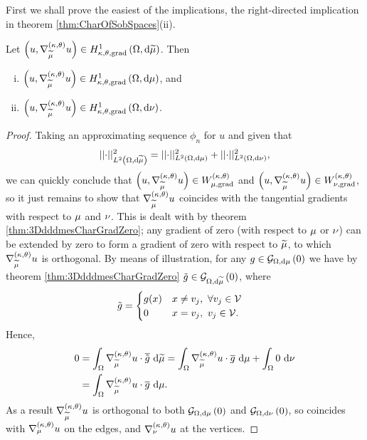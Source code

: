 First we shall prove the easiest of the implications, the right-directed implication in theorem \ref{thm:CharOfSobSpaces}(ii).
\begin{theorem} \label{thm:dddmesTangGradImplication}
	Let $\left( u,\nabla^{\left( \kappa, \theta \right)}_{\widetilde{\mu}}u \right)\in H^1_{\kappa,\theta,\mathrm{grad}}\left( \Omega, \mathrm{d}\widetilde{\mu} \right)$.
	Then
	\begin{enumerate}[(i)]
		\item $\left( u,\nabla^{\left( \kappa, \theta \right)}_{\widetilde{\mu}}u \right)\in H^1_{\kappa,\theta,\mathrm{grad}}\left( \Omega, \mathrm{d}\mu \right)$, and
		\item $\left( u,\nabla^{\left( \kappa, \theta \right)}_{\widetilde{\mu}}u \right)\in H^1_{\kappa,\theta,\mathrm{grad}}\left( \Omega, \mathrm{d}\nu \right)$.
	\end{enumerate}
\end{theorem}
\begin{proof}
	Taking an approximating sequence $\phi_n$ for $u$ and given that
	\begin{align*}
		\lvert\lvert \cdot \rvert\rvert_{L^{2}\left( \Omega,\mathrm{d} \widetilde{\mu} \right)}^2 = \lvert\lvert \cdot \rvert\rvert_{L^{2}\left( \Omega,\mathrm{d} \mu \right)}^2 + \lvert\lvert \cdot \rvert\rvert_{L^{2}\left( \Omega,\mathrm{d} \nu \right)}^2,
	\end{align*}
	we can quickly conclude that $\left( u,\nabla^{\left( \kappa, \theta \right)}_{\widetilde{\mu}}u \right)\in W_{\mu, \mathrm{grad}}^{\left( \kappa, \theta \right)}$ and $\left( u,\nabla^{\left( \kappa, \theta \right)}_{\widetilde{\mu}}u \right)\in W_{\nu, \mathrm{grad}}^{\left( \kappa, \theta \right)}$, so it just remains to show that $\nabla^{\left( \kappa, \theta \right)}_{\widetilde{\mu}}u$ coincides with the tangential gradients with respect to $\mu$ and $\nu$.
	This is dealt with by theorem \ref{thm:3DdddmesCharGradZero}; any gradient of zero (with respect to $\mu$ or $\nu$) can be extended by zero to form a gradient of zero with respect to $\widetilde{\mu}$, to which $\nabla^{\left( \kappa, \theta \right)}_{\widetilde{\mu}}u$ is orthogonal.
	By means of illustration, for any $g\in\mathcal{G}_{ \Omega, \mathrm{d}\mu}\left( 0 \right)$ we have by theorem \ref{thm:3DdddmesCharGradZero} $\tilde{g}\in\mathcal{G}_{ \Omega, \mathrm{d}\widetilde{\mu}}\left( 0 \right)$, where
	\begin{align*}
		\tilde{g} &= 
		\begin{cases} g(x) & x\neq v_j, \ \forall v_j\in\mathcal{V} \\ 0 & x=v_j, \ v_j\in\mathcal{V}. \end{cases}
	\end{align*}
	Hence,
	\begin{align*}
		0 &= \int_{\Omega} \nabla^{\left( \kappa, \theta \right)}_{\widetilde{\mu}}u\cdot\overline{\tilde{g}}  \ \mathrm{d}\widetilde{\mu}
		= \int_{\Omega} \nabla^{\left( \kappa, \theta \right)}_{\widetilde{\mu}}u\cdot\overline{g}  \ \mathrm{d}\mu + \int_{\Omega} 0  \ \mathrm{d}\nu \\
		&= \int_{\Omega} \nabla^{\left( \kappa, \theta \right)}_{\widetilde{\mu}}u\cdot\overline{g}  \ \mathrm{d}\mu.
	\end{align*}
	As a result $\nabla^{\left( \kappa, \theta \right)}_{\widetilde{\mu}}u$ is orthogonal to both $\mathcal{G}_{ \Omega, \mathrm{d}\mu}\left( 0 \right)$ and $\mathcal{G}_{ \Omega, \mathrm{d}\nu}\left( 0 \right)$, so coincides with $\nabla^{\left( \kappa, \theta \right)}_{\mu}u$ on the edges, and $\nabla^{\left( \kappa, \theta \right)}_{\nu}u$ at the vertices.
\end{proof}

